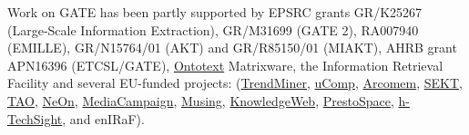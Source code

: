 \documentclass[12pt,a4paper,fleqn,final]{book}
\newcommand{\htlink}[2]{\href{#1}{#2}}
\begin{document}
\begin{titlepage}
{\begin{center}
\end{center}
}


\begin{small}
\begin{center}
%
Work on GATE has been partly supported by EPSRC grants GR/K25267
(Large-Scale Information Extraction), GR/M31699 (GATE 2), RA007940 (EMILLE),
GR/N15764/01 (AKT) and GR/R85150/01 (MIAKT), AHRB grant APN16396
(ETCSL/GATE),
\htlink{http://www.ontotext.com/}{Ontotext}
Matrixware,
the Information Retrieval Facility
and several EU-funded projects: 
(\htlink{http://www.trendminer-project.eu/}{TrendMiner},
\htlink{http://www.ucomp.eu/}{uComp},
\htlink{http://www.arcomem.eu/}{Arcomem},
\htlink{http://www.sekt-project.com}{SEKT},
\htlink{http://www.tao-project.eu}{TAO},
\htlink{http://www.neon-project.org}{NeOn},
\htlink{http://www.media-campaign.eu}{MediaCampaign},
\htlink{http://cordis.europa.eu/ist/kct/musing_synopsis.htm}{Musing},
\htlink{http://gate.ac.uk/projects/knowledge-web/}{KnowledgeWeb},
\htlink{http://www.prestospace.org}{PrestoSpace},
\htlink{http://gate.ac.uk/projects/htechsight/}{h-TechSight}, 
and enIRaF).
%
\end{center}
\end{small}

\end{titlepage}
\end{document}
